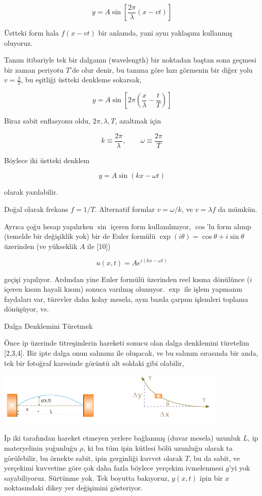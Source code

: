 \documentclass[12pt,fleqn]{article}\usepackage{../../common}
\begin{document}
$$
y = A \sin \left[ \frac{2\pi}{\lambda} (x - vt) \right]
$$

Üstteki form hala $f(x-vt)$ bir anlamda, yani aynı yaklaşımı kullanmış oluyoruz.

Tanım itibariyle tek bir dalganın (wavelength) bir noktadan baştan sona geçmesi
bir zaman periyotu $T$'de olur denir, bu tanıma göre hızı görmenin bir diğer
yolu $v = \frac{\lambda}{T}$, bu eşitliği üstteki denkleme sokarsak,

$$
y = A \sin \left[ 2\pi \left( \frac{x}{\lambda} - \frac{t}{T} \right) \right]
$$

Biraz sabit enflasyonu oldu, $2\pi,\lambda,T$, azaltmak için

$$
k \equiv \frac{2\pi}{\lambda}, \qquad 
\omega \equiv \frac{2\pi}{T}
$$

Böylece iki üstteki denklem

$$
y = A \sin(kx - \omega t)
$$

olarak yazılabilir.

Doğal olarak frekans $f = 1/T$. Alternatif formlar $v = \omega / k$, ve
$v = \lambda f$ da mümkün.

Ayrıca çoğu hesap yapılırken $\sin$ içeren form kullanılmıyor, $\cos$'lu form
alınıp (temelde bir değişiklik yok) bir de Euler formülü $\exp(i\theta) =
\cos\theta + i\sin\theta$ üzerinden (ve yükseklik $A$ ile [10])

$$
u(x,t) = A e^{i(kx - \omega t)}
$$

geçişi yapılıyor. Ardından yine Euler formülü üzerinden reel kısma dönülünce
($i$ içeren kısım hayali kısım) sonuca varılmış olunuyor. $\exp$ ile işlem
yapmanın faydaları var, türevler daha kolay mesela, aynı bazda çarpım işlemleri
toplama dönüşüyor, vs.

Dalga Denklemini Türetmek

Önce ip üzerinde titreşimlerin hareketi sonucu olan dalga denklemini türetelim
[2,3,4]. Bir ipte dalga onun salınımı ile oluşacak, ve bu salınım sırasında bir
anda, tek bir fotoğraf karesinde görüntü alt soldaki gibi olabilir,

\includegraphics[width=30em]{compscieng_app17wave_01.png}

İp iki tarafından hareket etmeyen yerlere bağlanmış (duvar mesela) uzunluk $L$,
ip materyelinin yoğunluğu $\rho$, ki bu tüm ipin kütlesi bölü uzunluğu olarak ta
görülebilir, bu örnekte sabit, ipin gerginliği kuvvet olarak $T$, bu da sabit,
ve yerçekimi kuvvetine göre çok daha fazla böylece yerçekim ivmelenmesi $g$'yi
yok sayabiliyoruz. Sürtünme yok. Tek boyutta bakıyoruz, $y(x,t)$ ipin bir $x$
noktasındaki dikey yer değişimini gösteriyor.
\end{document}
